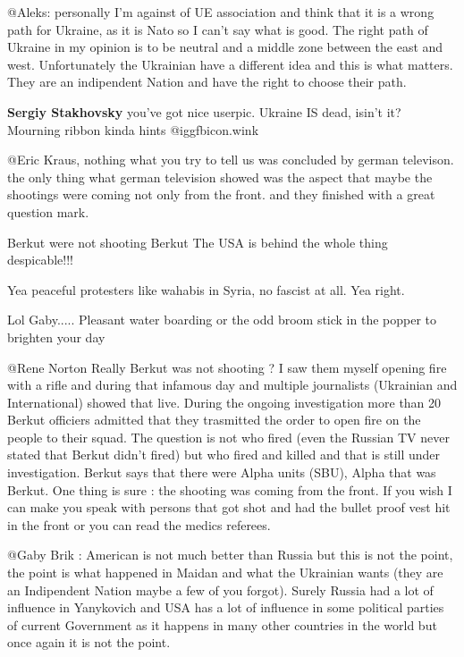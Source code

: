 \begin{itemize}
\begin{itemize}

@Aleks: personally I'm against of UE association and think that it is a wrong
path for Ukraine, as it is Nato so I can't say what is good. The right path of
Ukraine in my opinion is to be neutral and a middle zone between the east and
west. Unfortunately the Ukrainian have a different idea and this is what
matters. They are an indipendent Nation and have the right to choose their
path.

\textbf{Sergiy Stakhovsky} you've got nice userpic. Ukraine IS dead, isin't it? Mourning ribbon kinda hints  @igg{fbicon.wink} 

@Eric Kraus, nothing what you try to tell us was concluded by german televison. the only thing what german television showed was the aspect that maybe the shootings were coming not only from the front. and they finished with a great question mark.

Berkut were not shooting Berkut The USA is behind the whole thing despicable!!!

Yea peaceful protesters like wahabis in Syria, no fascist at all. Yea right.

Lol Gaby..... Pleasant water boarding or the odd broom stick in the popper to brighten your day


@Rene Norton Really Berkut was not shooting ? I saw them myself opening fire
with a rifle and during that infamous day and multiple journalists (Ukrainian
and International) showed that live. During the ongoing investigation more than
20 Berkut officiers admitted that they trasmitted the order to open fire on the
people to their squad. The question is not who fired (even the Russian TV never
stated that Berkut didn't fired) but who fired and killed and that is still
under investigation. Berkut says that there were Alpha units (SBU), Alpha that
was Berkut. One thing is sure : the shooting was coming from the front. If you
wish I can make you speak with persons that got shot and had the bullet proof
vest hit in the front or you can read the medics referees.



@Gaby Brik : American is not much better than Russia but this is not the point,
the point is what happened in Maidan and what the Ukrainian wants (they are an
Indipendent Nation maybe a few of you forgot). Surely Russia had a lot of
influence in Yanykovich and USA has a lot of influence in some political
parties of current Government as it happens in many other countries in the
world but once again it is not the point.


\end{itemize}
\end{itemize}
